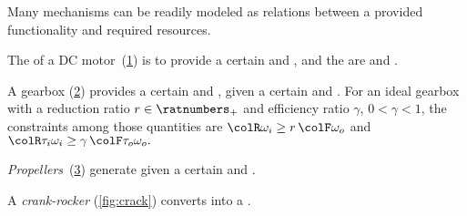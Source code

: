 
Many mechanisms can be readily modeled as relations between a provided
functionality and required resources.


\begin{example}
    The  of a DC motor~(\cref{fig:dc_motor})
    is to provide a certain  and , and the 
    are  and .
\end{example}

\begin{figure}[h]
    \begin{center}
    \end{center}
    \caption{}
    \label{fig:dc_motor}
\end{figure}


\begin{example}
    A gearbox (\cref{fig:gearbox}) provides a certain  and , given a certain
     and . For
    an ideal gearbox with a reduction ratio $r \in \ratnumbers_+$ and
    efficiency ratio $\gamma$, $0<\gamma<1$, the constraints among
    those quantities are ${\colR \omega_i}\geq r\,{\colF \omega_o}$
    and ${\colR \tau_i\omega_i}\geq\gamma\,{\colF \tau_o\omega_o}.$
\end{example}

\begin{figure}[h]
    \begin{center}
    \end{center}
    \caption{}
    \label{fig:gearbox}
\end{figure}


\begin{example}
    \emph{Propellers}~(\cref{fig:propeller}) generate 
    given a certain  and .
\end{example}

\begin{figure}[h]
    \begin{center}
    \end{center}
    \caption{\label{fig:propeller}}
\end{figure}

\begin{example}
    A \emph{crank-rocker} (\cref{fig:crack}) converts  into a .
\end{example}

